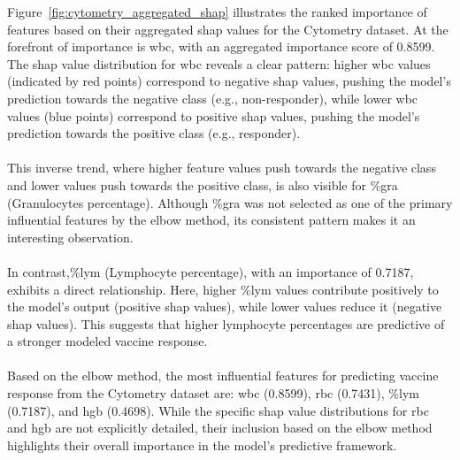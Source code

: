 \documentclass[12pt,a4paper]{report}
\begin{document}
\noindent
Figure~\ref{fig:cytometry_aggregated_shap} illustrates the ranked importance of features based on their aggregated \gls{shap} values for the Cytometry dataset. At the forefront of importance is \gls{wbc}, with an aggregated importance score of 0.8599. The \gls{shap} value distribution for \gls{wbc} reveals a clear pattern: higher \gls{wbc} values (indicated by red points) correspond to negative \gls{shap} values, pushing the model's prediction towards the negative class (e.g., non-responder), while lower \gls{wbc} values (blue points) correspond to positive \gls{shap} values, pushing the model's prediction towards the positive class (e.g., responder).\\
\\
This inverse trend, where higher feature values push towards the negative class and lower values push towards the positive class, is also visible for \%\acrshort{gra} (Granulocytes percentage). Although \%\acrshort{gra} was not selected as one of the primary influential features by the elbow method, its consistent pattern makes it an interesting observation.\\
\\
In contrast,\%\acrshort{lym} (Lymphocyte percentage), with an importance of 0.7187, exhibits a direct relationship. Here, higher \%\acrshort{lym} values contribute positively to the model's output (positive \gls{shap} values), while lower values reduce it (negative \gls{shap} values). This suggests that higher lymphocyte percentages are predictive of a stronger modeled vaccine response.\\
\\
Based on the elbow method, the most influential features for predicting vaccine response from the Cytometry dataset are: \gls{wbc} (0.8599), \acrshort{rbc} (0.7431), \%\acrshort{lym} (0.7187), and \acrshort{hgb} (0.4698). While the specific \gls{shap} value distributions for \acrshort{rbc} and \acrshort{hgb} are not explicitly detailed, their inclusion based on the elbow method highlights their overall importance in the model's predictive framework.

\end{document}
